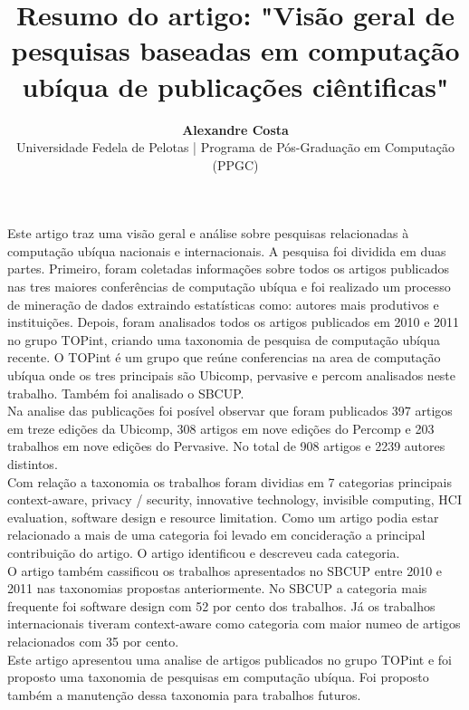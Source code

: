 \documentclass[a4paper,12pt]{article}
\title{\Large{\textbf{Resumo do artigo: "Visão geral de pesquisas baseadas em computação ubíqua de publicações ciêntificas"}}}
\author{\textbf{Alexandre Costa}\\
\normalsize{Universidade Fedela de Pelotas | Programa de Pós-Graduação em Computação (PPGC)}}
\date{\null}
\begin{document}
	\maketitle
	\thispagestyle{empty}
	\normalsize{
		Este artigo traz uma visão geral e análise sobre pesquisas relacionadas à computação ubíqua nacionais e internacionais. A pesquisa foi dividida em duas partes. Primeiro, foram coletadas informações sobre todos os artigos publicados nas tres maiores conferências de computação ubíqua e foi realizado um processo de mineração de dados extraindo estatísticas como: autores mais produtivos e instituições. Depois, foram analisados todos os artigos publicados em 2010 e 2011 no grupo TOPint, criando uma taxonomia de pesquisa de computação ubíqua recente. O TOPint é um grupo que reúne conferencias na area de computação ubíqua onde os tres principais são Ubicomp, pervasive e percom analisados neste trabalho. Também foi analisado o SBCUP.\\
		Na analise das publicações foi posível observar que foram publicados 397 artigos em treze edições da Ubicomp, 308 artigos em nove edições do Percomp e 203 trabalhos em nove edições do Pervasive. No total de 908 artigos e 2239 autores distintos.\\
		Com relação a taxonomia os trabalhos foram dividias em 7 categorias principais context-aware, privacy / security, innovative technology, invisible computing, HCI evaluation, software design e resource limitation. Como um artigo podia estar relacionado a mais de uma categoria foi levado em concideração a principal contribuição do artigo. O artigo identificou e descreveu cada categoria.\\
		O artigo também cassificou os trabalhos apresentados no SBCUP entre 2010 e 2011 nas taxonomias propostas anteriormente. No SBCUP a categoria mais frequente foi software design com 52 por cento dos trabalhos. Já os trabalhos internacionais tiveram context-aware como categoria com maior numeo de artigos relacionados com 35 por cento.\\
		Este artigo apresentou uma analise de artigos publicados no grupo TOPint e foi proposto uma taxonomia de pesquisas em computação ubíqua. Foi proposto também a manutenção dessa taxonomia para trabalhos futuros.
	}
\end{document}
